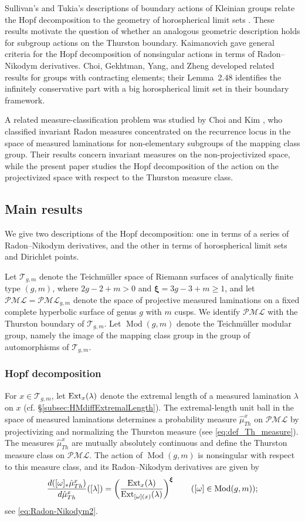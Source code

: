 \documentclass[dvipdfmx]{amsart}
\theoremstyle{remark}
\newcommand{\ext}{{\rm Ext}}
\newcommand{\teich}{\mathcal{T}}
\newcommand{\tmod}{\operatorname{Mod}}
\newcommand{\PThursM}{\hat{\mu}_{Th}}
\newcommand{\convgenus}{{\boldsymbol \xi}}
\newcommand{\pml}{\mathcal{PML}}
\begin{document}
Sullivan's and Tukia's descriptions of boundary actions of
Kleinian groups relate the Hopf decomposition to the geometry of horospherical limit sets \cite{Sullivan1981,Tukia1997}. These results motivate the question of whether an analogous geometric description holds for subgroup actions on the Thurston boundary.
Kaimanovich \cite{Kaimanovich2010} gave general criteria for the Hopf decomposition of nonsingular actions in terms of Radon--Nikodym derivatives.
Choi, Gekhtman, Yang, and Zheng \cite{choi2024confinedsubgroupsgroupscontracting} developed related results for groups with contracting elements; their Lemma~2.48 identifies the infinitely conservative part with a big horospherical limit set in their boundary framework.

A related measure-classification problem was studied by Choi and Kim \cite{ChoiKim2025InvariantMeasures}, who classified invariant Radon measures concentrated on the recurrence locus in the space of measured laminations for non-elementary subgroups of the mapping class group. Their results concern invariant measures on the non-projectivized space, while the present paper studies the Hopf decomposition of the action on the projectivized space with respect to the Thurston measure class.

\subsection{Main results}
We give two descriptions of the Hopf decomposition: one in terms of a series of Radon--Nikodym derivatives, and the other in terms of horospherical limit sets and Dirichlet points.

Let $\teich_{g,m}$ denote the Teichm\"uller space of Riemann surfaces of analytically finite type $(g,m)$, where $2g-2+m>0$ and $\convgenus=3g-3+m\ge 1$, and let $\pml=\pml_{g,m}$ denote the space of projective measured laminations on a fixed complete hyperbolic surface of genus $g$ with $m$ cusps. We identify $\pml$ with the Thurston boundary of $\teich_{g,m}$.
Let $\tmod(g,m)$ denote the Teichm\"uller modular group, namely the image of the mapping class group in the group of automorphisms of $\teich_{g,m}$.

\subsubsection{Hopf decomposition}
For $x\in\teich_{g,m}$, let $\ext_x(\lambda)$ denote the extremal length of a measured lamination $\lambda$ on $x$ (cf. \S\ref{subsec:HMdiffExtremalLength}).
The extremal-length unit ball in the space of measured laminations determines a probability measure $\PThursM^x$ on $\pml$ by projectivizing and normalizing the Thurston measure (see \eqref{eq:def_Th_measure}).
The measures $\PThursM^x$ are mutually absolutely continuous and define the Thurston measure class on $\pml$.
The action of $\tmod(g,m)$ is nonsingular with respect to this measure
class, and its Radon--Nikodym derivatives are given by
\[
\frac{d([\omega]_*\PThursM^x)}{d\PThursM^x}([\lambda])
=\left(
\frac{\ext_x(\lambda)}{\ext_{[\omega](x)}(\lambda)}
\right)^{\convgenus}
\qquad ([\omega]\in\tmod(g,m));
\]
see \eqref{eq:Radon-Nikodym2}.
\end{document}
